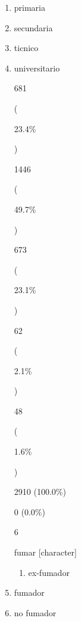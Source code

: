 \documentclass[
]{book}
\providecommand{\tightlist}{%
  \setlength{\itemsep}{0pt}\setlength{\parskip}{0pt}}
\begin{document}
\begin{enumerate}
  (

  48.8\%

  )

  2910
  (100.0\%)

  0
  (0.0\%)

  4

  edad
  {[}integer{]}

  Mean (sd) : 48.9 (11.9)
  min \textless{} med \textless{} max:
  20 \textless{} 49 \textless{} 84
  IQR (CV) : 18 (0.2)

  62 distinct values

  2910
  (100.0\%)

  0
  (0.0\%)

  5

  niveledu
  {[}character{]}

  \begin{enumerate}
  \def\labelenumii{\arabic{enumii}.}
  \tightlist
  \item
    ninguno
  \end{enumerate}
\item
  primaria
\item
  secundaria
\item
  ticnico
\item
  universitario

  681

  (

  23.4\%

  )

  1446

  (

  49.7\%

  )

  673

  (

  23.1\%

  )

  62

  (

  2.1\%

  )

  48

  (

  1.6\%

  )

  2910
  (100.0\%)

  0
  (0.0\%)

  6

  fumar
  {[}character{]}

  \begin{enumerate}
  \def\labelenumii{\arabic{enumii}.}
  \tightlist
  \item
    ex-fumador
  \end{enumerate}
\item
  fumador
\item
  no fumador


\end{enumerate}
\end{document}
